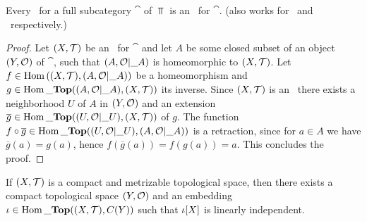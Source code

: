 \begin{theorem} \label{theorem:ane\_to\_anr}
	Every \ane\ for a full subcategory $\cat$ of $\Top$ is an \anr\ for $\cat$. (also works for \aex\ and \ar\ respectively.)
\end{theorem}
\begin{proof}
	Let $\tspace$ be an \ane\ for $\cat$ and let $A$ be some closed subset of an object $\tspace[Y][O]$ of $\cat$, such that ${\left ( A, \mathcal{O}\vert\_A \right )}$ is homeomorphic to $\tspace$. Let $f \in \Hom\pbraces{\tspace, \reltspace[A][O]}$ be a homeomorphism and $g \in \Hom\_\Top\pbraces{\reltspace[A][O], \tspace}$ its inverse. Since $\tspace$ is an \ane\, there exists a neighborhood $U$ of $A$ in $\tspace[Y][O]$ and an extension $\overline{g} \in \Hom\_\Top\pbraces{\reltspace[U][O], \tspace}$ of $g$. The function $f \circ \overline{g} \in \operatorname{Hom}\_\mathbf{Top}{\left ( {\left ( U, \mathcal{O}\vert\_U \right )}, {\left ( A, \mathcal{O}\vert\_A \right )} \right )}$ is a retraction, since for $a \in A$ we have $\overline{g}(a) = g(a)$, hence $f(\overline{g}(a)) = f(g(a)) = a$. This concludes the proof. 
\end{proof}

\begin{lemma}
	If $\tspace$ is a compact and metrizable topological space, then there exists a compact topological space $\tspace[Y][O]$ and an embedding $\iota \in \Hom\_\Top\pbraces{\tspace, C(Y)}$ such that $\iota{\left [ X \right ]}$ is linearly independent. 
\end{lemma}

